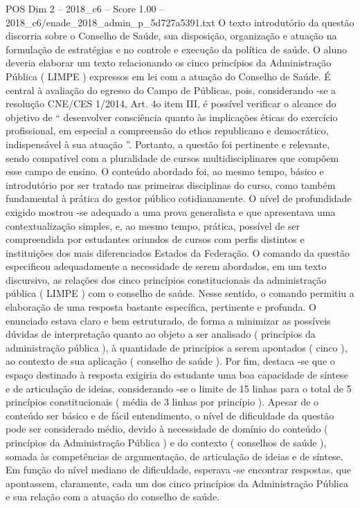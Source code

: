 \begin{textsample}{POS Dim 2 – 2018\_c6 – Score 1.00 – 2018\_c6/enade\_2018\_admin\_p\_5d727a5391.txt}
O texto introdutório da questão discorria sobre o Conselho de Saúde, sua disposição, organização e atuação na formulação de estratégias e no controle e execução da política de saúde.
O aluno deveria elaborar um texto relacionando os cinco princípios da Administração Pública ( LIMPE ) expressos em lei com a atuação do Conselho de Saúde.
É central à avaliação do egresso do Campo de Públicas, pois, considerando -se a resolução CNE/CES 1/2014, Art. 4o item III, é possível verificar o alcance do objetivo de “ desenvolver consciência quanto às implicações éticas do exercício profissional, em especial a compreensão do ethos republicano e democrático, indispensável à sua atuação ”.
Portanto, a questão foi pertinente e relevante, sendo compatível com a pluralidade de cursos multidisciplinares que compõem esse campo de ensino.
O conteúdo abordado foi, ao mesmo tempo, básico e introdutório por ser tratado nas primeiras disciplinas do curso, como também fundamental à prática do gestor público cotidianamente.
O nível de profundidade exigido mostrou -se adequado a uma prova generalista e que apresentava uma contextualização simples, e, ao mesmo tempo, prática, possível de ser compreendida por estudantes oriundos de cursos com perfis distintos e instituições dos mais diferenciados Estados da Federação.
O comando da questão especificou adequadamente a necessidade de serem abordados, em um texto discursivo, as relações dos cinco princípios constitucionais da administração pública ( LIMPE ) com o conselho de saúde.
Nesse sentido, o comando permitiu a elaboração de uma resposta bastante específica, pertinente e profunda.
O enunciado estava claro e bem estruturado, de forma a minimizar as possíveis dúvidas de interpretação quanto ao objeto a ser analisado ( princípios da administração pública ), à quantidade de princípios a serem apontados ( cinco ), ao contexto de sua aplicação ( conselho de saúde ).
Por fim, destaca -se que o espaço destinado à resposta exigiria do estudante uma boa capacidade de síntese e de articulação de ideias, considerando -se o limite de 15 linhas para o total de 5 princípios constitucionais ( média de 3 linhas por princípio ).
Apesar de o conteúdo ser básico e de fácil entendimento, o nível de dificuldade da questão pode ser considerado médio, devido à necessidade de domínio do conteúdo ( princípios da Administração Pública ) e do contexto ( conselhos de saúde ), somada às competências de argumentação, de articulação de ideias e de síntese.
Em função do nível mediano de dificuldade, esperava -se encontrar respostas, que apontassem, claramente, cada um dos cinco princípios da Administração Pública e sua relação com a atuação do conselho de saúde.

\end{textsample}
